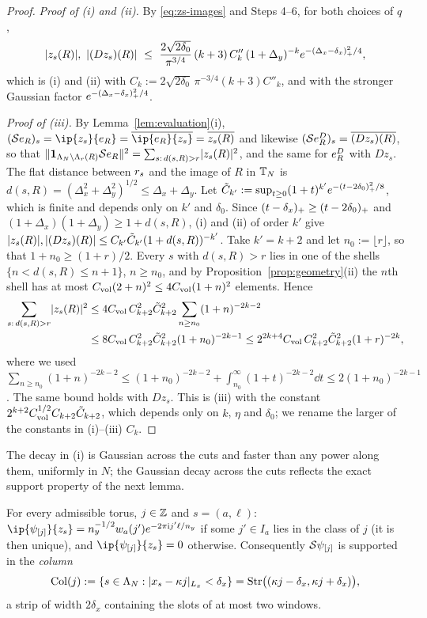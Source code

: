 \begin{proof}
\emph{Proof of (i) and (ii).} By \eqref{eq:zs-images} and Steps 4--6, for both choices of $q$,
\[
\abs{z_s(R)},\ \abs{(Dz_s)(R)}\ \le\ \frac{2\sqrt{2\delta_0}}{\pi^{3/4}}\,(k+3)\,C''_k\,(1+\Delta_y)^{-k}e^{-\pos{\Delta_x-\delta_x}^2/4},
\]
which is (i) and (ii) with $C_k:=2\sqrt{2\delta_0}\,\pi^{-3/4}(k+3)C''_k$, and with the stronger Gaussian factor
$e^{-(\Delta_x-\delta_x)_{+}^2/4}$.

\emph{Proof of (iii).} By Lemma~\ref{lem:evaluation}(i), $(\Sa\ev R)_s=\ip{z_s}{\ev R}=\overline{\ip{\ev R}{z_s}}=\overline{z_s(R)}$
and likewise $(\mathcal{S}e^{D}_{R})_s=\overline{(Dz_s)(R)}$, so that
$\lVert\mathbf{1}_{\Lambda_N\setminus\Lambda_{r}(R)}\mathcal{S}e_{R}\rVert^2=\sum_{s:\,d(s,R)>r}\lvert z_s(R)\rvert^2$, and the same for $e^{D}_{R}$ with
$Dz_s$. The flat distance between $r_{s}$ and the image of $R$ in $\mathbb{T}_N$ is $d(s,R)=(\Delta_x^2+\Delta_y^2)^{1/2}\le
\Delta_x+\Delta_y$. Let $\tilde C_{k'}:=\sup_{t\ge0}(1+t)^{k'}e^{-(t-2\delta_0)_{+}^2/8}$, which is finite and depends
only on $k'$ and $\delta_0$. Since $(t-\delta_x)_{+}\ge(t-2\delta_0)_{+}$ and $(1+\Delta_x)(1+\Delta_y)\ge1+d(s,R)$, (i)
and (ii) of order $k'$ give $\lvert z_s(R)\rvert,\lvert(Dz_s)(R)\rvert\le C_{k'}\tilde C_{k'}(1+d(s,R))^{-k'}$. Take $k'=k+2$ and
let $n_0:=\lfloor r\rfloor$, so that $1+n_0\ge(1+r)/2$. Every $s$ with $d(s,R)>r$ lies in one of the shells
$\{n<d(s,R)\le n+1\}$, $n\ge n_0$, and by Proposition~\ref{prop:geometry}(ii) the $n$th shell has at most
$C_{\mathrm{vol}}(2+n)^2\le4C_{\mathrm{vol}}(1+n)^2$ elements. Hence
\begin{align*}
\sum_{s:\,d(s,R)>r}\lvert z_s(R)\rvert^2&\le4C_{\mathrm{vol}}\,C_{k+2}^2\tilde C_{k+2}^2\sum_{n\ge n_0}(1+n)^{-2k-2}\\
&\le8C_{\mathrm{vol}}\,C_{k+2}^2\tilde C_{k+2}^2(1+n_0)^{-2k-1}\le2^{2k+4}C_{\mathrm{vol}}\,C_{k+2}^2\tilde C_{k+2}^2(1+r)^{-2k},
\end{align*}
where we used $\sum_{n\ge n_0}(1+n)^{-2k-2}\le(1+n_0)^{-2k-2}+\int_{n_0}^\infty(1+t)^{-2k-2}\dd t\le2(1+n_0)^{-2k-1}$.
The same bound holds with $Dz_s$. This is (iii) with the constant $2^{k+2}C_{\mathrm{vol}}^{1/2}C_{k+2}\tilde C_{k+2}$, which
depends only on $k$, $\eta$ and $\delta_0$; we rename the larger of the constants in (i)--(iii) $C_k$.
\end{proof}

The decay in (i) is Gaussian across the cuts and faster than any power along them, uniformly in $N$; the
Gaussian decay across the cuts reflects the exact support property of the next lemma.

\begin{lemma}\label{lem:columns}
For every admissible torus, $j\in\mathbb{Z}$ and $s=(a,\ell)$: $\ip{\psi_{[j]}}{z_s}=\ny^{-1/2}w_a(j')e^{-2\pi\iu j'\ell/\ny}$
if some $j'\in I_a$ lies in the class of $j$ (it is then unique), and $\ip{\psi_{[j]}}{z_s}=0$ otherwise.
Consequently $\mathcal{S}\psi_{[j]}$ is supported in the \emph{column}
\[
\mathrm{Col}(j):=\{s\in\Lambda_N:\lvert x_s-\kappa j\rvert_{L_x}<\delta_x\}=\mathrm{Str}\bigl((\kappa j-\delta_x,\kappa j+\delta_x)\bigr),
\]
a strip of width $2\delta_x$ containing the slots of at most two windows.
\end{lemma}

